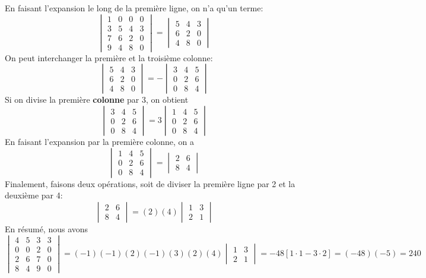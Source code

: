En faisant l'expansion le long de la première ligne, on n'a qu'un terme:
\[
\begin{vmatrix}
1& 0 & 0 & 0 \\
3& 5 & 4 & 3 \\
7& 6 & 2 & 0 \\
9& 4 & 8 & 0
\end{vmatrix}
=  
\begin{vmatrix}
5 & 4 & 3 \\
6 & 2 & 0 \\
4 & 8 & 0
\end{vmatrix}
\]
On peut interchanger la première et la troisième colonne:
\[
\begin{vmatrix}
5 & 4 & 3 \\
6 & 2 & 0 \\
4 & 8 & 0
\end{vmatrix} = -
\begin{vmatrix}
3& 4 & 5 \\
0& 2 & 6 \\
0& 8 & 4
\end{vmatrix}
\]
Si on divise la première \textbf{colonne} par 3, on obtient
\[
\begin{vmatrix}
3& 4 & 5 \\
0& 2 & 6 \\
0& 8 & 4
\end{vmatrix} = 3
\begin{vmatrix}
1& 4 & 5 \\
0& 2 & 6 \\
0& 8 & 4
\end{vmatrix}
\]
En faisant l'expansion par la première colonne, on a
\[
\begin{vmatrix}
1& 4 & 5 \\
0& 2 & 6 \\
0& 8 & 4
\end{vmatrix} = 
\begin{vmatrix}
 2 & 6 \\
 8 & 4
\end{vmatrix}
\]
Finalement, faisons deux opérations, soit de diviser la première ligne par 2 et la deuxième par 4:
\[
\begin{vmatrix}
 2 & 6 \\
 8 & 4
\end{vmatrix} = (2)(4)
\begin{vmatrix}
 1 & 3 \\
 2 & 1
\end{vmatrix}
\]
En résumé, nous avons
\[
\begin{vmatrix}
4 & 5 & 3 & 3 \\
0 & 0 & 2 & 0 \\
2 & 6 & 7 & 0 \\
8 & 4 & 9 & 0
\end{vmatrix}
= (-1)(-1)(2)(-1)(3)(2)(4)
\begin{vmatrix}
 1 & 3 \\
 2 & 1
\end{vmatrix} = -48 [1\cdot 1 - 3\cdot 2] = (-48)(-5) = 240
\]
